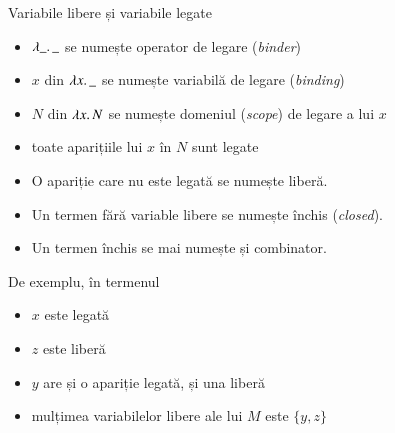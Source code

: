 \documentclass[xcolor=pdftex,romanian,colorlinks]{beamer}
\begin{document}
\begin{frame}[fragile]{ Variabile libere și variabile legate}

\begin{itemize}
\item $\lambda \_.\,\_$ se numește operator \alert{de legare} (\textit{binder})
\item $x$ din $\lambda x.\,\_$ se numește variabilă \alert{de legare} (\textit{binding})
\item $N$ din $\lambda x.\,N$ se numește \alert{domeniul} (\textit{scope}) de legare a lui $x$
\item toate aparițiile lui $x$ în $N$ sunt legate
\item O apariție care nu este legată se numește \alert{liberă}.
\item Un termen fără variable libere se numește \alert{închis} (\textit{closed}). 
\item Un termen închis se mai numește și \alert{combinator}.
\end{itemize}

\bigskip
De exemplu, în termenul
\vspace{-.4cm}
\begin{center}
\end{center}
\vspace{-.6cm}
\begin{itemize}
	\item $x$ este legată
	\item $z$ este liberă
	\item $y$ are și o apariție legată, și una liberă
	\item mulțimea variabilelor libere ale lui $M$ este $\{y,z\}$
\end{itemize}
\end{frame}

\end{document}
